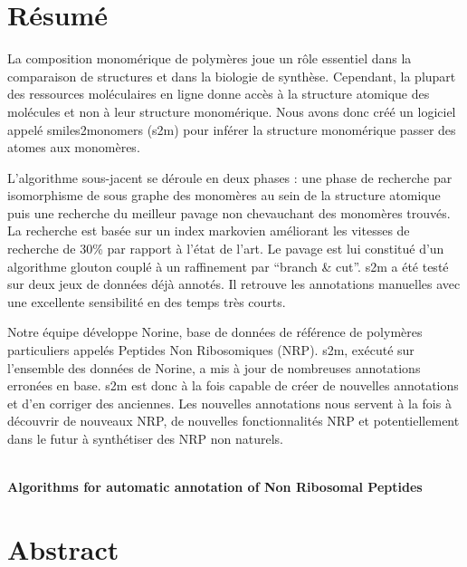 \documentclass[12pt]{LHSV_thesis}
\begin{document}
\section*{\Huge Résumé}
%
\vspace{2cm}

La composition monomérique de polymères joue un rôle essentiel dans la comparaison de structures et dans la biologie de synthèse.
Cependant, la plupart des ressources moléculaires en ligne donne accès à la structure atomique des molécules et non à leur structure monomérique.
Nous avons donc créé un logiciel appelé smiles2monomers (s2m) pour inférer la structure monomérique passer des atomes aux monomères.

L'algorithme sous-jacent se déroule en deux phases : une phase de recherche par isomorphisme de sous graphe des monomères au sein de la structure atomique puis une recherche du meilleur pavage non chevauchant des monomères trouvés.
La recherche est basée sur un index markovien améliorant les vitesses de recherche de 30\% par rapport à l'état de l'art.
Le pavage est lui constitué d'un algorithme glouton couplé à un raffinement par ``branch \& cut''.
s2m a été testé sur deux jeux de données déjà annotés.
Il retrouve les annotations manuelles avec une excellente sensibilité en des temps très courts.

Notre équipe développe Norine, base de données de référence de polymères particuliers appelés Peptides Non Ribosomiques (NRP).
s2m, exécuté sur l'ensemble des données de Norine, a mis à jour de nombreuses annotations erronées en base.
s2m est donc à la fois capable de créer de nouvelles annotations et d'en corriger des anciennes.
Les nouvelles annotations nous servent à la fois à découvrir de nouveaux NRP, de nouvelles fonctionnalités NRP et potentiellement dans le futur à synthétiser des NRP non naturels.


\clearpage

\begin{center}
~\vspace{6.0cm}\\
\thispagestyle{plain}
\Huge \textbf{Algorithms for automatic annotation of Non Ribosomal Peptides}
\vspace*{\fill}
\clearpage
\end{center}

\section*{\Huge Abstract}
%
\vspace{2cm}
\end{document}
